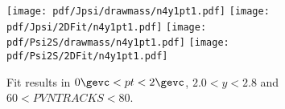 \begin{figure}[H]
\begin{center}
\texttt{[image: pdf/Jpsi/drawmass/n4y1pt1.pdf]}
\texttt{[image: pdf/Jpsi/2DFit/n4y1pt1.pdf]}
\vspace*{-0.5cm}
\texttt{[image: pdf/Psi2S/drawmass/n4y1pt1.pdf]}
\texttt{[image: pdf/Psi2S/2DFit/n4y1pt1.pdf]}
\vspace*{-0.5cm}
\end{center}
\caption{Fit results in $0\gevc<pt<2\gevc$, $2.0<y<2.8$ and $60<PVNTRACKS<80$.}
\label{Fitn4y1pt1}
\end{figure}
